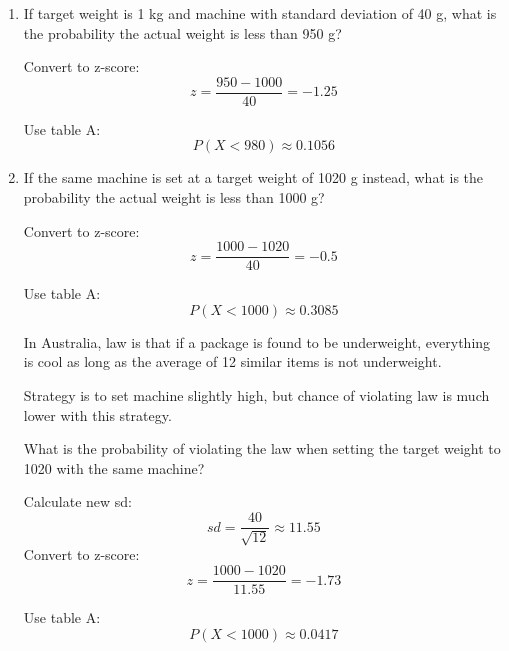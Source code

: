 \documentclass[landscape]{exam}
\begin{document}
  \begin{enumerate}
    \item If target weight is 1 kg and machine with standard deviation of 40 g,
      what is the probability the actual weight is less than 950 g?

    \begin{solution}
      Convert to z-score:
      \[
        z = \frac{950 - 1000}{40} = -1.25
      \]

      Use table A:
      \[
        P(X < 980) \approx 0.1056
      \]
    \end{solution}

    \item If the same machine is set at a target weight of 1020 g instead, what
      is the probability the actual weight is less than 1000 g?

    \begin{solution}
      Convert to z-score:
      \[
        z = \frac{1000 - 1020}{40} = -0.5
      \]

      Use table A:
      \[
        P(X < 1000) \approx 0.3085
      \]
    \end{solution}

    In Australia, law is that if a package is found to be underweight,
    everything is cool as long as the average of 12 similar items is not
    underweight.


    Strategy is to set machine slightly high, but chance of violating law is
    much lower with this strategy.

    What is the probability of violating the law when setting the target weight
    to 1020 with the same machine?

    \begin{solution}
      Calculate new sd:
      \[
        sd = \frac{40}{\sqrt{12}} \approx 11.55
      \]
      Convert to z-score:
      \[
        z = \frac{1000 - 1020}{11.55} = -1.73
      \]

      Use table A:
      \[
        P(X < 1000) \approx 0.0417
      \]
    \end{solution}

  \end{enumerate}
\end{document}
